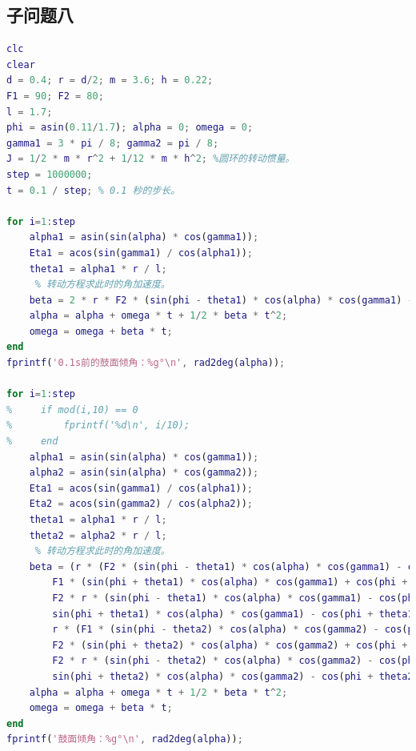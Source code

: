 \documentclass{cumcm}
\begin{document}
\subsection{子问题八}
\begin{lstlisting}[language=matlab]
clc
clear
d = 0.4; r = d/2; m = 3.6; h = 0.22;
F1 = 90; F2 = 80;
l = 1.7;
phi = asin(0.11/1.7); alpha = 0; omega = 0;
gamma1 = 3 * pi / 8; gamma2 = pi / 8;
J = 1/2 * m * r^2 + 1/12 * m * h^2; %圆环的转动惯量。
step = 1000000;
t = 0.1 / step; % 0.1 秒的步长。

for i=1:step
    alpha1 = asin(sin(alpha) * cos(gamma1));
    Eta1 = acos(sin(gamma1) / cos(alpha1));
    theta1 = alpha1 * r / l;
     % 转动方程求此时的角加速度。
    beta = 2 * r * F2 * (sin(phi - theta1) * cos(alpha) * cos(gamma1) - cos(phi - theta1) * sin(alpha1) * sin(Eta1)) / J;
    alpha = alpha + omega * t + 1/2 * beta * t^2;
    omega = omega + beta * t;
end
fprintf('0.1s前的鼓面倾角：%g°\n', rad2deg(alpha));

for i=1:step
%     if mod(i,10) == 0
%         fprintf('%d\n', i/10);
%     end
    alpha1 = asin(sin(alpha) * cos(gamma1));
    alpha2 = asin(sin(alpha) * cos(gamma2));
    Eta1 = acos(sin(gamma1) / cos(alpha1));
    Eta2 = acos(sin(gamma2) / cos(alpha2));
    theta1 = alpha1 * r / l;
    theta2 = alpha2 * r / l;
     % 转动方程求此时的角加速度。
    beta = (r * (F2 * (sin(phi - theta1) * cos(alpha) * cos(gamma1) - cos(phi - theta1) * sin(alpha1) * sin(Eta1)) - ...
        F1 * (sin(phi + theta1) * cos(alpha) * cos(gamma1) + cos(phi + theta1) * sin(alpha1) * sin(Eta1))) + ...
        F2 * r * (sin(phi - theta1) * cos(alpha) * cos(gamma1) - cos(phi - theta1) * sin(alpha1) * sin(Eta1) - ...
        sin(phi + theta1) * cos(alpha) * cos(gamma1) - cos(phi + theta1) * sin(alpha1) * sin(Eta1)) + ...
        r * (F1 * (sin(phi - theta2) * cos(alpha) * cos(gamma2) - cos(phi - theta2) * sin(alpha2) * sin(Eta2)) - ...
        F2 * (sin(phi + theta2) * cos(alpha) * cos(gamma2) + cos(phi + theta2) * sin(alpha2) * sin(Eta2))) + ...
        F2 * r * (sin(phi - theta2) * cos(alpha) * cos(gamma2) - cos(phi - theta2) * sin(alpha2) * sin(Eta2) - ...
        sin(phi + theta2) * cos(alpha) * cos(gamma2) - cos(phi + theta2) * sin(alpha2) * sin(Eta2))) / J;
    alpha = alpha + omega * t + 1/2 * beta * t^2;
    omega = omega + beta * t;
end
fprintf('鼓面倾角：%g°\n', rad2deg(alpha));
\end{lstlisting}
\end{document}
